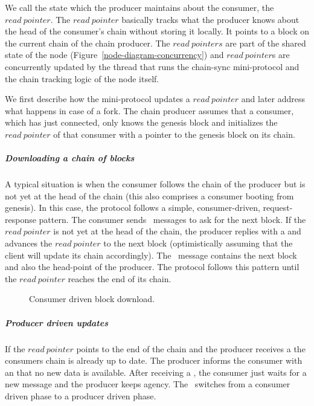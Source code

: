 \documentclass{report}
\theoremstyle{definition}{
  \newtheorem{lemma}{Lemma}[section] %
  \newtheorem{definition}[lemma]{Definition}
}
\theoremstyle{theorem}{
  \newtheorem{invariant}[lemma]{Invariant}
  \newtheorem{proofobligation}[lemma]{Proof Obligation}
}
\numberwithin{equation}{lemma}
\begin{document}
We call the state which the producer maintains about the consumer, the $read~pointer$.
The $read~pointer$ basically tracks what the producer knows about the head of
the consumer's chain without storing it locally.
It points to a block on the current chain of the chain producer.
The $read~pointers$ are part of the shared state of the node (Figure~\ref{node-diagram-concurrency}) and
$read~pointer$s are concurrently updated by the thread that runs the chain-sync mini-protocol and the
chain tracking logic of the node itself.

We first describe how the mini-protocol updates a $read~pointer$ and later address what happens in case
of a fork.
The chain producer assumes that a consumer, which has just connected,
only knows the genesis block and initializes the $read~pointer$ of that consumer
with a pointer to the genesis block on its chain.

\subparagraph{Downloading a chain of blocks}
A typical situation is when the consumer follows the chain of the producer but is not yet at the head of the
chain (this also comprises a consumer booting from genesis).
In this case, the protocol follows a simple, consumer-driven, request-response pattern.
The consumer sends \RequestNext~messages to ask for the next block.
If the $read~pointer$ is not yet at the head of the chain,
the producer replies with a \RollForward{} and advances the $read~pointer$ to
the next block (optimistically assuming that the client will update its chain
accordingly).
The \RollForward~message contains the next block and also the head-point of the producer.
The protocol follows this pattern until the $read~pointer$ reaches the end of its chain.

\begin{figure}[h]
\begin{center}
\end{center}
\caption{Consumer driven block download.}
\label{read-pointer-consumer-driver}
\end{figure}

\subparagraph{Producer driven updates}
If the $read~pointer$ points to the end of the chain and the producer receives
a \RequestNext{}
the consumers chain is already up to date.
The producer informs the consumer with an \AwaitReply{} that no new data is available.
After receiving a \AwaitReply, the consumer just waits for a new message and the producer keeps agency.
The \AwaitReply~switches from a consumer driven phase to a producer driven phase.
\end{document}
